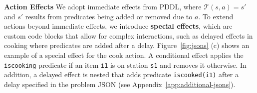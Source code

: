 \textbf{Action Effects} We adopt immediate effects from PDDL, where $\mathcal{T}(s, a) = s'$ and $s'$ results from predicates being added or removed due to $a$. To extend actions beyond immediate effects, we introduce \textbf{special effects}, which are custom code blocks that allow for complex interactions, such as delayed effects in cooking where predicates are added after a delay. Figure~\ref{fig:jsons} (c) shows an example of a special effect for the cook action. A conditional effect applies the \texttt{iscooking} predicate if an item \texttt{i1} is on station \texttt{s1} and removes it otherwise. In addition, a delayed effect is nested that adds predicate \texttt{iscooked(i1)} after a delay specified in the problem JSON (see Appendix~\ref{app:additional-jsons}).





